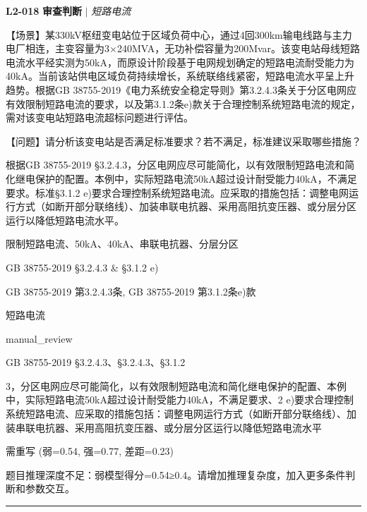 \documentclass[11pt,a4paper]{ctexart}
\begin{document}
\noindent\textbf{L2-018} \hfill \textbf{审查判断} $|$ \textit{短路电流}
\begin{description}[leftmargin=1.5em,style=nextline,font=\normalfont]
  \item[Q:] 【场景】某330kV枢纽变电站位于区域负荷中心，通过4回300km输电线路与主力电厂相连，主变容量为3×240MVA，无功补偿容量为200Mvar。该变电站母线短路电流水平经实测为50kA，而原设计阶段基于电网规划确定的短路电流耐受能力为40kA。当前该站供电区域负荷持续增长，系统联络线紧密，短路电流水平呈上升趋势。根据GB 38755-2019《电力系统安全稳定导则》第3.2.4.3条关于分区电网应有效限制短路电流的要求，以及第3.1.2条e)款关于合理控制系统短路电流的规定，需对该变电站短路电流超标问题进行评估。

【问题】请分析该变电站是否满足标准要求？若不满足，标准建议采取哪些措施？
  \item[A:] 根据GB 38755-2019 §3.2.4.3，分区电网应尽可能简化，以有效限制短路电流和简化继电保护的配置。本例中，实际短路电流50kA超过设计耐受能力40kA，不满足要求。标准§3.1.2 e)要求合理控制系统短路电流。应采取的措施包括：调整电网运行方式（如断开部分联络线）、加装串联电抗器、采用高阻抗变压器、或分层分区运行以降低短路电流水平。
  \item[KW:] 限制短路电流、50kA、40kA、串联电抗器、分层分区
  \item[标准:] GB 38755-2019 §3.2.4.3 \& §3.1.2 e)
  \item[条款溯源:] GB 38755-2019 第3.2.4.3条, GB 38755-2019 第3.1.2条e)款
  \item[主题:] 短路电流
  \item[评分方式:] manual\_review
  \item[Rubric条款:] GB 38755-2019 §3.2.4.3、§3.2.4.3、§3.1.2
  \item[Rubric判据:] 3，分区电网应尽可能简化，以有效限制短路电流和简化继电保护的配置、本例中，实际短路电流50kA超过设计耐受能力40kA，不满足要求、2 e)要求合理控制系统短路电流、应采取的措施包括：调整电网运行方式（如断开部分联络线）、加装串联电抗器、采用高阻抗变压器、或分层分区运行以降低短路电流水平
  \item[LJ判定:] 需重写 (弱=0.54, 强=0.77, 差距=0.23)
  \item[LJ反馈:] 题目推理深度不足：弱模型得分=0.54≥0.4。请增加推理复杂度，加入更多条件判断和参数交互。
\end{description}
\vspace{4pt}
\hrule
\vspace{6pt}
\end{document}
